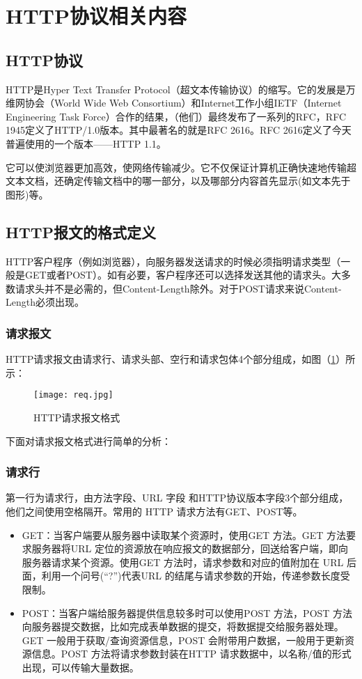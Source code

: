 \documentclass[bachelor]{thesis-uestc}
\begin{document}
\section{HTTP协议相关内容}

\subsection{HTTP协议}

HTTP是Hyper Text Transfer Protocol（超文本传输协议）的缩写。它的发展是万维网协会（World Wide Web Consortium）和Internet工作小组IETF（Internet Engineering Task Force）合作的结果，（他们）最终发布了一系列的RFC，RFC 1945定义了HTTP/1.0版本。其中最著名的就是RFC 2616。RFC 2616定义了今天普遍使用的一个版本——HTTP 1.1。

它可以使浏览器更加高效，使网络传输减少。它不仅保证计算机正确快速地传输超文本文档，还确定传输文档中的哪一部分，以及哪部分内容首先显示(如文本先于图形)等。
\subsection{HTTP报文的格式定义}

HTTP客户程序（例如浏览器），向服务器发送请求的时候必须指明请求类型（一般是GET或者POST）。如有必要，客户程序还可以选择发送其他的请求头。大多数请求头并不是必需的，但Content-Length除外。对于POST请求来说Content-Length必须出现。 

\subsubsection{请求报文}

HTTP请求报文由请求行、请求头部、空行和请求包体4个部分组成，如图（\ref{httpreq}）所示：
\begin{figure}[h]
\texttt{[image: req.jpg]}
\caption{HTTP请求报文格式}
\label{httpreq} 
\end{figure}

下面对请求报文格式进行简单的分析：

\subsubsection*{请求行}

第一行为请求行，由方法字段、URL 字段 和HTTP协议版本字段3个部分组成，他们之间使用空格隔开。常用的 HTTP 请求方法有GET、POST等。

\begin{itemize}
	\item GET：当客户端要从服务器中读取某个资源时，使用GET 方法。GET 方法要求服务器将URL 定位的资源放在响应报文的数据部分，回送给客户端，即向服务器请求某个资源。使用GET 方法时，请求参数和对应的值附加在 URL 后面，利用一个问号(“?”)代表URL 的结尾与请求参数的开始，传递参数长度受限制。
	\item POST：当客户端给服务器提供信息较多时可以使用POST 方法，POST 方法向服务器提交数据，比如完成表单数据的提交，将数据提交给服务器处理。GET 一般用于获取/查询资源信息，POST 会附带用户数据，一般用于更新资源信息。POST 方法将请求参数封装在HTTP 请求数据中，以名称/值的形式出现，可以传输大量数据。
\end{itemize}
\end{document}
